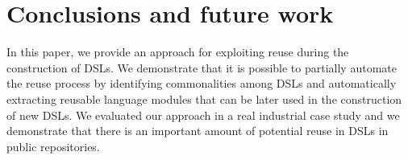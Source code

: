 \section{Conclusions and future work}
\label{sec:conclusions}
In this paper, we provide an approach for exploiting reuse during the construction of DSLs. We demonstrate that it is possible to partially automate the reuse process by identifying commonalities among DSLs and automatically extracting reusable language modules that can be later used in the construction of new DSLs. We evaluated our approach in a real industrial case study and we demonstrate that there is an important amount of potential reuse in DSLs in public repositories.



